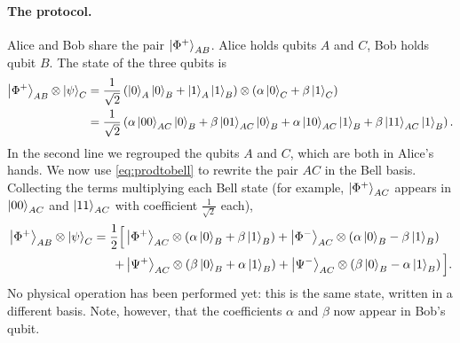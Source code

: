 \paragraph{The protocol.} Alice and Bob share the pair $\left|\Phi^+\right\rangle_{AB}$. Alice holds qubits $A$ and $C$, Bob holds qubit $B$. The state of the three qubits is
\begin{align}
  \left|\Phi^+\right\rangle_{AB}\otimes\left|\psi\right\rangle_C&=\frac1{\sqrt2}\left(\left|0\right\rangle_A\left|0\right\rangle_B+\left|1\right\rangle_A\left|1\right\rangle_B\right)\otimes\left(\alpha\left|0\right\rangle_C+\beta\left|1\right\rangle_C\right)\nonumber\\
  &=\frac1{\sqrt2}\left(\alpha\left|00\right\rangle_{AC}\left|0\right\rangle_B+\beta\left|01\right\rangle_{AC}\left|0\right\rangle_B+\alpha\left|10\right\rangle_{AC}\left|1\right\rangle_B+\beta\left|11\right\rangle_{AC}\left|1\right\rangle_B\right).
\end{align}
In the second line we regrouped the qubits $A$ and $C$, which are both in Alice's hands. We now use \cref{eq:prodtobell} to rewrite the pair $AC$ in the Bell basis. Collecting the
terms multiplying each Bell state (for example, $\left|\Phi^+\right\rangle_{AC}$ appears in $\left|00\right\rangle_{AC}$ and $\left|11\right\rangle_{AC}$ with coefficient $\frac1{\sqrt2}$ each),
\begin{align}
  \left|\Phi^+\right\rangle_{AB}\otimes\left|\psi\right\rangle_C=\frac12\Big[&\left|\Phi^+\right\rangle_{AC}\otimes\left(\alpha\left|0\right\rangle_B+\beta\left|1\right\rangle_B\right)
  +\left|\Phi^-\right\rangle_{AC}\otimes\left(\alpha\left|0\right\rangle_B-\beta\left|1\right\rangle_B\right)\nonumber\\
  +&\left|\Psi^+\right\rangle_{AC}\otimes\left(\beta\left|0\right\rangle_B+\alpha\left|1\right\rangle_B\right)
  +\left|\Psi^-\right\rangle_{AC}\otimes\left(\beta\left|0\right\rangle_B-\alpha\left|1\right\rangle_B\right)\Big].\label{eq:teleport}
\end{align}
No physical operation has been performed yet: this is the same state, written in a different basis. Note, however, that the coefficients $\alpha$ and $\beta$ now appear in Bob's qubit.

